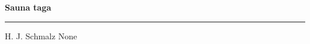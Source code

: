 \documentclass[10pt]{book}
\begin{document}
{
  \samepage
  \raggedbottom
  \raggedright
  \sloppy


  \vspace{0.2in}

  \noindent\begin{minipage}{.1\textwidth}
    \hfill\vspace{0.1in}
  \end{minipage}%
  \noindent\begin{minipage}{.8\textwidth}
    \centering
    \bfseries
    \large Sauna taga
  \end{minipage}%
  \noindent\begin{minipage}{.1\textwidth}
      \hfill\vspace{0.1in}
  \end{minipage}

  \nopagebreak[4]
  \vspace{0.1in}
  \nopagebreak[4]
  \hrule height 0.05ex
  \nopagebreak[4]
  \vspace{-0.05in}

  {\footnotesize H. J. Schmalz \hfill None }\\
  \vspace{0.01in}



}
\end{document}
